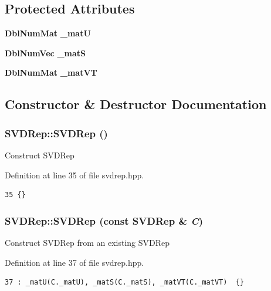 \subsection*{Protected Attributes}
\begin{CompactItemize}
\item 
{\bf Dbl\-Num\-Mat} {\bf \_\-mat\-U}
\item 
{\bf Dbl\-Num\-Vec} {\bf \_\-mat\-S}
\item 
{\bf Dbl\-Num\-Mat} {\bf \_\-mat\-VT}
\end{CompactItemize}


\subsection{Constructor \& Destructor Documentation}
\subsubsection{\setlength{\rightskip}{0pt plus 5cm}SVDRep::SVDRep ()\hspace{0.3cm}{\tt  [inline]}}\label{classSVDRep_da26a387223ff9a37b57ff36fe156c8b_da26a387223ff9a37b57ff36fe156c8b}


Construct SVDRep 

Definition at line 35 of file svdrep.hpp.

\footnotesize\begin{verbatim}35 {}
\end{verbatim}\normalsize 


\subsubsection{\setlength{\rightskip}{0pt plus 5cm}SVDRep::SVDRep (const {\bf SVDRep} \& {\em C})\hspace{0.3cm}{\tt  [inline]}}\label{classSVDRep_8c2db96b45f21fdbe776e309700bc779_8c2db96b45f21fdbe776e309700bc779}


Construct SVDRep from an existing SVDRep 

Definition at line 37 of file svdrep.hpp.

\footnotesize\begin{verbatim}37 : _matU(C._matU), _matS(C._matS), _matVT(C._matVT)  {}
\end{verbatim}\normalsize 


